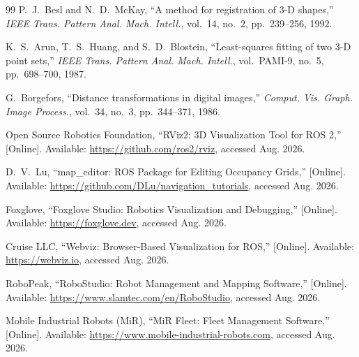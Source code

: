 \documentclass[journal]{IEEEtran}
\begin{document}
\begin{thebibliography}{99}
P.~J.~Besl and N.~D.~McKay, ``A method for registration of 3-D shapes,'' \emph{IEEE Trans. Pattern Anal. Mach. Intell.}, vol.~14, no.~2, pp.\ 239--256, 1992.

K.~S.~Arun, T.~S.~Huang, and S.~D.~Blostein, ``Least-squares fitting of two 3-D point sets,'' \emph{IEEE Trans. Pattern Anal. Mach. Intell.}, vol.\ PAMI-9, no.~5, pp.\ 698--700, 1987.

G.~Borgefors, ``Distance transformations in digital images,'' \emph{Comput. Vis. Graph. Image Process.}, vol.~34, no.~3, pp.\ 344--371, 1986.

Open Source Robotics Foundation, ``RViz2: 3D Visualization Tool for ROS 2,'' [Online]. Available: \url{https://github.com/ros2/rviz}, accessed Aug. 2026.

D.~V.~Lu, ``map\_editor: ROS Package for Editing Occupancy Grids,'' [Online]. Available: \url{https://github.com/DLu/navigation_tutorials}, accessed Aug. 2026.

Foxglove, ``Foxglove Studio: Robotics Visualization and Debugging,'' [Online]. Available: \url{https://foxglove.dev}, accessed Aug. 2026.

Cruise LLC, ``Webviz: Browser-Based Visualization for ROS,'' [Online]. Available: \url{https://webviz.io}, accessed Aug. 2026.

RoboPeak, ``RoboStudio: Robot Management and Mapping Software,'' [Online]. Available: \url{https://www.slamtec.com/en/RoboStudio}, accessed Aug. 2026.

Mobile Industrial Robots (MiR), ``MiR Fleet: Fleet Management Software,'' [Online]. Available: \url{https://www.mobile-industrial-robots.com}, accessed Aug. 2026.

\end{thebibliography}
\end{document}
